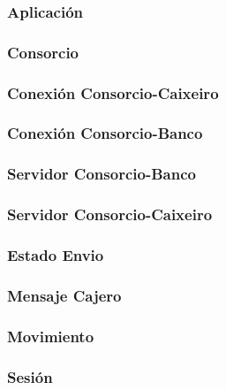 \documentclass[a4paper,titlepage]{article}
\begin{document}
\subsubsection{Aplicación}

\subsubsection{Consorcio}

\subsubsection{Conexión Consorcio-Caixeiro}

\subsubsection{Conexión Consorcio-Banco}

\subsubsection{Servidor Consorcio-Banco}

\subsubsection{Servidor Consorcio-Caixeiro}

\subsubsection{Estado Envio}

\subsubsection{Mensaje Cajero}

\subsubsection{Movimiento}

\subsubsection{Sesión}

\end{document}
